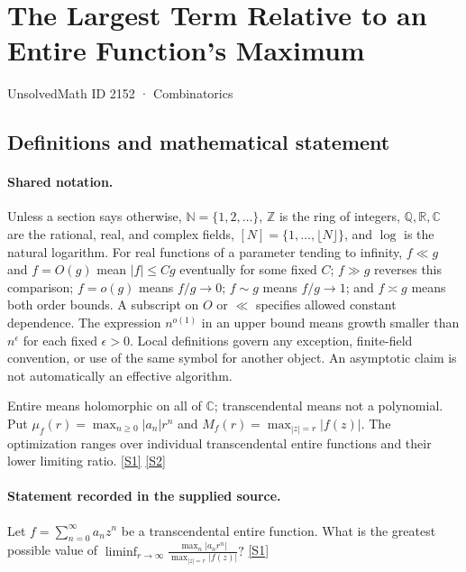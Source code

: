 \documentclass[11pt,a4paper]{article}
\newcommand{\N}{\mathbb{N}}
\newcommand{\Z}{\mathbb{Z}}
\newcommand{\Q}{\mathbb{Q}}
\newcommand{\R}{\mathbb{R}}
\newcommand{\C}{\mathbb{C}}
\newcommand{\sref}[2]{\hyperlink{source:#1:#2}{[S#2]}}
\begin{document}

\setcounter{section}{2151}

\section{The Largest Term Relative to an Entire Function's Maximum}\label{2152}

{\small\sffamily UnsolvedMath ID 2152 · Combinatorics}

\subsection{Definitions and mathematical statement}

\paragraph{Shared notation.}Unless a section says otherwise, $\N=\{1,2,\ldots\}$,
$\Z$ is the ring of integers, $\Q,\R,\C$ are the rational, real, and complex
fields, $[N]=\{1,\ldots,\lfloor N\rfloor\}$, and $\log$ is the natural
logarithm. For real functions of a parameter tending to infinity,
$f\ll g$ and $f=O(g)$ mean $|f|\leq Cg$ eventually for some fixed $C$;
$f\gg g$ reverses this comparison; $f=o(g)$ means $f/g\to0$;
$f\sim g$ means $f/g\to1$; and $f\asymp g$ means both order bounds.
A subscript on $O$ or $\ll$ specifies allowed constant dependence.
The expression $n^{o(1)}$ in an upper bound means growth smaller than
$n^\epsilon$ for each fixed $\epsilon>0$. Local definitions govern any
exception, finite-field convention, or use of the same symbol for another
object. An asymptotic claim is not automatically an effective algorithm.



Entire means holomorphic on all of $\C$; transcendental means not a polynomial. Put $\mu_f(r)=\max_{n\geq0}|a_n|r^n$ and $M_f(r)=\max_{|z|=r}|f(z)|$. The optimization ranges over individual transcendental entire functions and their lower limiting ratio. \sref{2152}{1} \sref{2152}{2}

\paragraph{Statement recorded in the supplied source.}
Let $f=\sum_{n=0}^\infty a_nz^n$ be a transcendental entire function. What is the greatest possible value of $ \liminf_{r\to \infty} \frac{\max_n\lvert a_nr^n\rvert}{\max_{\lvert z\rvert=r}\lvert f(z)\rvert}? $ \sref{2152}{1}
\end{document}
